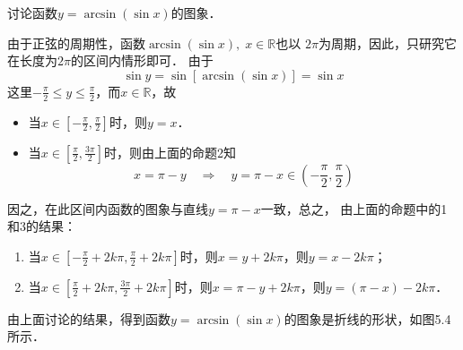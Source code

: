 \begin{example}
    讨论函数$y=\arcsin(\sin x)$的图象．
\end{example}

\begin{solution}
    由于正弦的周期性，函数$\arcsin(\sin x),\; x\in\mathbb{R}$也以
$2\pi$为周期，因此，只研究它在长度为$2\pi$的区间内情形即可．
由于
\[\sin y=\sin[\arcsin(\sin x)]=\sin x\]
这里$-\frac{\pi}{2}\le y\le \frac{\pi}{2}$，而$x\in\mathbb{R}$，故
\begin{itemize}
    \item 当$x\in\left[-\frac{\pi}{2},\frac{\pi}{2}\right]$时，则$y=x$．
    \item 当$x\in\left[\frac{\pi}{2},\frac{3\pi}{2}\right]$时，则由上面的命题2知
    \[x=\pi-y\quad \Rightarrow\quad y=\pi-x\in \left(-\frac{\pi}{2},\frac{\pi}{2}\right)\]
\end{itemize}
因之，在此区间内函数的图象与直线$y=\pi-x$一致，总之，
由上面的命题中的1和3的结果：
\begin{enumerate}
    \item 当$x\in \left[-\frac{\pi}{2}+2k\pi,\frac{\pi}{2}+2k\pi\right]$时，则$x=y+2k\pi$，则$y=x-2k\pi$；
    \item 当$x\in \left[\frac{\pi}{2}+2k\pi,\frac{3\pi}{2}+2k\pi\right]$时，则$x=\pi-y+2k\pi$，则$y=(\pi-x)-2k\pi$．
\end{enumerate}
由上面讨论的结果，得到函数$y= \arcsin
(\sin x)$的图象是折线的形状，如图5.4所示．
\begin{figure}[htp]
    \centering
{}
    \caption{}
\end{figure}
\end{solution}



